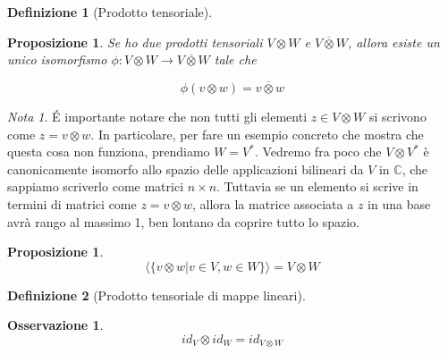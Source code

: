 \documentclass[11pt]{article}
\theoremstyle{plain}
\newtheorem{prop}[thm]{Proposizione}
\theoremstyle{definition}
\newtheorem{defn}{Definizione}[section]
\newtheorem*{rem}{Osservazione}
\theoremstyle{remark}
\newtheorem*{note}{Nota}
\newcommand{\C}{\mathbb{C}}
\begin{document}
  


\begin{defn}[Prodotto tensoriale]
    



\label{defn:prodotto tensoriale}
\end{defn}


\begin{prop}
Se ho due prodotti tensoriali $V \otimes W$ e $V \overline{\otimes} W$, allora esiste un unico isomorfismo $\phi: V \otimes W \to V \overline{\otimes} W$ tale che

\[ \phi (v\otimes w) = v \overline{\otimes} w\]
\end{prop}


\begin{note}
\'E importante notare che non tutti gli elementi $z \in V \otimes W$ si scrivono come $z = v \otimes w$. In particolare, per fare un esempio concreto che mostra che questa cosa non funziona, prendiamo $W = V^*$. Vedremo fra poco che $V\otimes V^*$ è canonicamente isomorfo allo spazio delle applicazioni bilineari da $V$ in $\C$, che sappiamo scriverlo come matrici $n\times n$. Tuttavia se un elemento si scrive in termini di matrici come $z = v\otimes w$, allora la matrice associata a $z$ in una base avrà rango al massimo 1, ben lontano da coprire tutto lo spazio.
\end{note}


\begin{prop}
\[\langle\{ v \otimes w | v \in V, w \in W\} \rangle  = V \otimes W\]

\end{prop}


\begin{defn}[Prodotto tensoriale di mappe lineari]

\end{defn}

\begin{rem}

\[ id_V \otimes id_W = id_{V\otimes W}\]
\end{rem}
\end{document}
